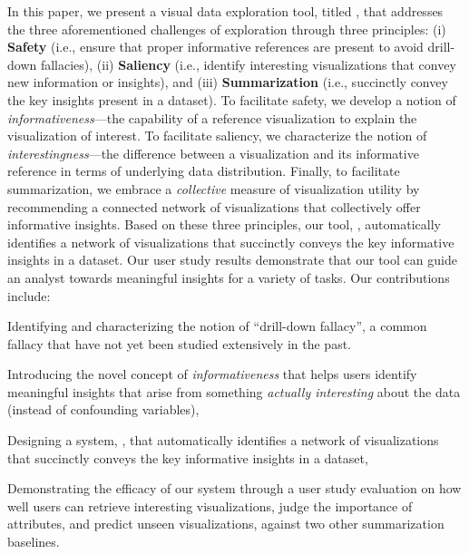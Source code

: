 \par In this paper, we present a visual data exploration tool, titled \system, that addresses the three aforementioned challenges of exploration through three principles: (i) \textbf{Safety} (i.e., ensure that proper informative references are present to avoid drill-down fallacies), (ii) \textbf{Saliency} (i.e., identify interesting visualizations that convey new information or insights), and (iii) \textbf{Summarization} (i.e., succinctly convey the key insights present in a dataset). To facilitate safety, we develop a notion of \emph{informativeness}---the capability of a reference visualization to explain the visualization of interest. To facilitate saliency, we characterize the notion of \emph{interestingness}---the difference between a visualization and its informative reference in terms of underlying data distribution. Finally, to facilitate summarization, we embrace a \emph{collective} measure of visualization utility by recommending a connected network of visualizations that collectively offer informative insights. Based on these three principles, our tool, \system, automatically identifies a network of visualizations that succinctly conveys the key informative insights in a dataset. Our user study results demonstrate that our tool can guide an analyst towards meaningful insights for a variety of tasks. Our contributions include:
\begin{denselist}
\item Identifying and characterizing the notion of ``drill-down fallacy'', a common fallacy that have not yet been studied extensively in the past.
\item Introducing the novel concept of \emph{informativeness} that helps users identify meaningful insights that arise from something \textit{actually interesting} about the data (instead of confounding variables),
\item Designing a system, \system, that automatically identifies a network of visualizations that succinctly conveys the key informative insights in a dataset,
\item Demonstrating the efficacy of our system through a user study evaluation on how well users can retrieve interesting visualizations, judge the importance of attributes, and predict unseen visualizations, against two other summarization baselines.
\end{denselist}